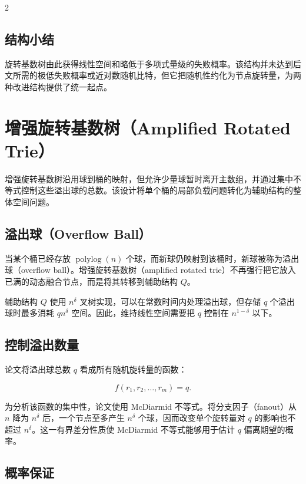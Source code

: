 \documentclass[10.5pt,compsoc,UTF8]{CjC}
\theoremstyle{mystyle}
\begin{document}
\begin{multicols}{2}
\subsection{\heiti 结构小结}

旋转基数树由此获得线性空间和略低于多项式量级的失败概率。该结构并未达到后文所需的极低失败概率或近对数随机比特，但它把随机性约化为节点旋转量，为两种改进结构提供了统一起点。

\section{\heiti 增强旋转基数树（Amplified Rotated Trie）}

增强旋转基数树沿用球到桶的映射，但允许少量球暂时离开主数组，并通过集中不等式控制这些溢出球的总数。该设计将单个桶的局部负载问题转化为辅助结构的整体空间问题。

\subsection{\heiti 溢出球（Overflow Ball）}

当某个桶已经存放 $\operatorname{polylog}(n)$ 个球，而新球仍映射到该桶时，新球被称为溢出球（overflow ball）。增强旋转基数树（amplified rotated trie）不再强行把它放入已满的动态融合节点，而是将其转移到辅助结构 $Q$。

辅助结构 $Q$ 使用 $n^\delta$ 叉树实现，可以在常数时间内处理溢出球，但存储 $q$ 个溢出球时最多消耗 $qn^\delta$ 空间。因此，维持线性空间需要把 $q$ 控制在 $n^{1-\delta}$ 以下。

\subsection{\heiti 控制溢出数量}

论文将溢出球总数 $q$ 看成所有随机旋转量的函数：

\begin{equation}
f(r_1,r_2,\ldots,r_m)=q .
\end{equation}

为分析该函数的集中性，论文使用 McDiarmid 不等式\cite{mcdiarmid1989bounded}。将分支因子（fanout）从 $n$ 降为 $n^\delta$ 后，一个节点至多产生 $n^\delta$ 个球，因而改变单个旋转量对 $q$ 的影响也不超过 $n^\delta$。这一有界差分性质使 McDiarmid 不等式能够用于估计 $q$ 偏离期望的概率。

\subsection{\heiti 概率保证}


\end{multicols}
\end{document}

